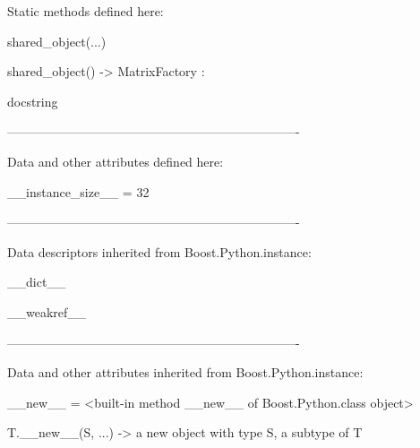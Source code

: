 \documentclass[letterpaper,10pt,english]{sphinxmanual}
\begin{document}
\begin{description}
\begin{description}
\begin{DUlineblock}{0em}
\item[] Static methods defined here:
\item[] 
\item[] shared\_object(...)
\item[]
\begin{DUlineblock}{\DUlineblockindent}
\item[] shared\_object() -\textgreater{} MatrixFactory :
\item[]
\begin{DUlineblock}{\DUlineblockindent}
\item[] docstring
\item[] 
\end{DUlineblock}
\end{DUlineblock}
\item[] ----------------------------------------------------------------------
\item[] Data and other attributes defined here:
\item[] 
\item[] \_\_instance\_size\_\_ = 32
\item[] 
\item[] ----------------------------------------------------------------------
\item[] Data descriptors inherited from Boost.Python.instance:
\item[] 
\item[] \_\_dict\_\_
\item[] 
\item[] \_\_weakref\_\_
\item[] 
\item[] ----------------------------------------------------------------------
\item[] Data and other attributes inherited from Boost.Python.instance:
\item[] 
\item[] \_\_new\_\_ = \textless{}built-in method \_\_new\_\_ of Boost.Python.class object\textgreater{}
\item[]
\begin{DUlineblock}{\DUlineblockindent}
\item[] T.\_\_new\_\_(S, ...) -\textgreater{} a new object with type S, a subtype of T
\end{DUlineblock}
\end{DUlineblock}


\end{description}
\end{description}
\end{document}
